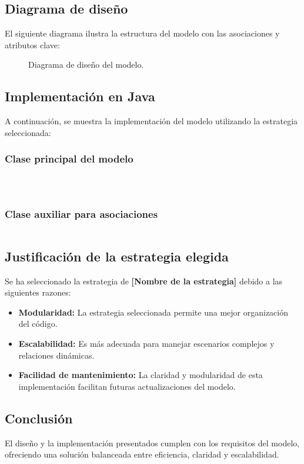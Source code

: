 \subsection{Diagrama de diseño}
El siguiente diagrama ilustra la estructura del modelo con las asociaciones y atributos clave:

\begin{figure}[H]
    \centering
    \caption{Diagrama de diseño del modelo.}
    \label{fig:diagrama_diseno}
\end{figure}

\subsection{Implementación en Java}
A continuación, se muestra la implementación del modelo utilizando la estrategia seleccionada:

\subsubsection{Clase principal del modelo}
\begin{lstlisting}[language=Java]

   
\end{lstlisting}

\subsubsection{Clase auxiliar para asociaciones}
\begin{lstlisting}[language=Java]

\end{lstlisting}

\subsection{Justificación de la estrategia elegida}
Se ha seleccionado la estrategia de \textbf{[Nombre de la estrategia]} debido a las siguientes razones:
\begin{itemize}
    \item \textbf{Modularidad:} La estrategia seleccionada permite una mejor organización del código.
    \item \textbf{Escalabilidad:} Es más adecuada para manejar escenarios complejos y relaciones dinámicas.
    \item \textbf{Facilidad de mantenimiento:} La claridad y modularidad de esta implementación facilitan futuras actualizaciones del modelo.
\end{itemize}

\subsection{Conclusión}
El diseño y la implementación presentados cumplen con los requisitos del modelo, ofreciendo una solución balanceada entre eficiencia, claridad y escalabilidad.